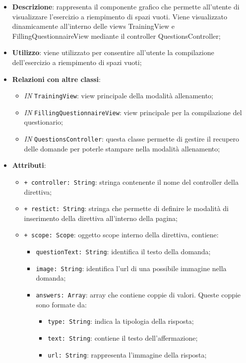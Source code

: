 		\begin{itemize}
			\item \textbf{Descrizione}: rappresenta il componente grafico che permette all'utente di visualizzare l'esercizio a riempimento di spazi vuoti. Viene visualizzato dinamicamente all'interno delle views TrainingView e FillingQuestionnaireView mediante il controller QuestionsController;
			\item \textbf{Utilizzo}: viene utilizzato per consentire all'utente la compilazione dell'esercizio a riempimento di spazi vuoti;
			\item \textbf{Relazioni con altre classi}: 
			\begin{itemize}
				\item \textit{IN} \texttt{TrainingView}: view principale della modalità allenamento; 
				\item \textit{IN} \texttt{FillingQuestionnaireView}: view principale per la compilazione del questionario;
				\item \textit{IN} \texttt{QuestionsController}: questa classe permette di gestire il recupero delle domande per poterle stampare nella modalità allenamento;
			\end{itemize}
			\item \textbf{Attributi}: 
			\begin{itemize}
				\item \texttt{+ controller: String}: stringa contenente il nome del controller della direttiva;
				\item \texttt{+ restict: String}: stringa che permette di definire le modalità di inserimento della direttiva all'interno della pagina;
				\item \texttt{+ scope: Scope}: oggetto scope interno della direttiva, contiene:
				\begin{itemize}
					\item \texttt{questionText: String}: identifica il testo della domanda;
					\item \texttt{image: String}: identifica l'url di una possibile immagine nella domanda;
					\item \texttt{answers: Array}: array che contiene coppie di valori. Queste coppie sono formate da:
					\begin{itemize}
						\item \texttt{type: String}: indica la tipologia della risposta;
						\item \texttt{text: String}: contiene il testo dell'affermazione;
						\item \texttt{url: String}: rappresenta l'immagine della risposta;

\end{itemize}
\end{itemize}
\end{itemize}
\end{itemize}
